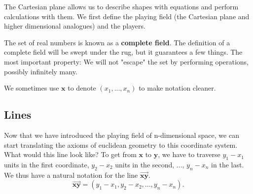 The Cartesian plane allows us to describe shapes with equations and perform calculations with them. We first define the playing field (the Cartesian plane and higher dimensional analogues) and the players.
\begin{remark}
	The set of real numbers is known as a \textbf{complete field}. The definition of a complete field will be swept under the rug, but it guarantees a few things. The most important property: We will not "escape" the set by performing operations, possibly infinitely many.
\end{remark}
\begin{remark}
	We sometimes use $\mathbf{x}$ to denote $(x_1,...,x_n)$ to make notation cleaner.
\end{remark}
\subsection{Lines}
Now that we have introduced the playing field of n-dimensional space, we can start translating the axioms of euclidean geometry to this coordinate system.
What would this line look like? To get from $\mathbf{x}$ to $\mathbf{y}$, we have to traverse $y_1-x_1$ units in the first coordinate, $y_2-x_2$ units in the second, ..., $y_n-x_n$ in the last. We thus have a natural notation for the line $\overrightarrow{\mathbf{xy}}$.
\[
 \overrightarrow{\mathbf{xy}}=(y_1-x_1,y_2-x_2,...,y_n-x_n).
\]

